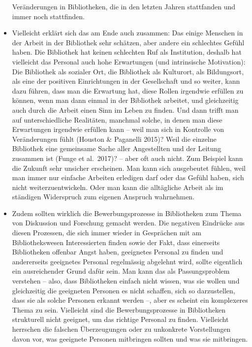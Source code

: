 \documentclass[a4paper,
fontsize=11pt,
oneside,
numbers=noperiodatend,
parskip=half-,
bibliography=totoc,
final
]{scrartcl}
\begin{document}
\begin{itemize}
  Veränderungen in Bibliotheken, die in den letzten Jahren stattfanden
  und immer noch stattfinden.
\item
  Vielleicht erklärt sich das am Ende auch zusammen: Das einige Menschen
  in der Arbeit in der Bibliothek sehr schätzen, aber andere ein
  schlechtes Gefühl haben. Die Bibliothek hat keinen schlechten Ruf als
  Institution, deshalb hat vielleicht das Personal auch hohe Erwartungen
  (und intrinsische Motivation): Die Bibliothek als sozialer Ort, die
  Bibliothek als Kulturort, als Bildungsort, als eine der positiven
  Einrichtungen in der Gesellschaft und so weiter, kann dazu führen,
  dass man die Erwartung hat, diese Rollen irgendwie erfüllen zu können,
  wenn man dann einmal in der Bibliothek arbeitet, und gleichzeitig auch
  durch die Arbeit einen Sinn im Leben zu finden. Und dann trifft man
  auf unterschiedliche Realitäten, manchmal solche, in denen man diese
  Erwartungen irgendwie erfüllen kann -- weil man sich in Kontrolle von
  Veränderungen fühlt (Houston \& Paganelli 2015)? Weil die einzelne
  Bibliothek eine gemeinsame Sache aller Angestellten und der Leitung
  zusammen ist (Funge et al.~2017)? -- aber oft auch nicht. Zum Beispiel
  kann die Zukunft sehr unsicher erscheinen. Man kann sich ausgebeutet
  fühlen, weil man immer nur einfache Arbeiten erledigen darf oder das
  Gefühl haben, sich nicht weiterzuentwickeln. Oder man kann die
  alltägliche Arbeit als im ständigen Widerspruch zum eigenen Anspruch
  wahrnehmen.
\item
  Zudem sollten wirklich die Bewerbungsprozesse in Bibliotheken zum
  Thema von Diskussion und Forschung gemacht werden. Die negativen
  Eindrücke aus diesen Prozessen, die sich immer wieder in Gesprächen
  mit am Bibliothekswesen Interessierten finden sowie der Fakt, dass
  einerseits Bibliotheken offenbar Angst haben, geeignetes Personal zu
  finden und andererseits geeignetes Personal regelmässig abgelehnt
  wird, sollte eigentlich ein ausreichender Grund dafür sein. Man kann
  das als Passungsproblem verstehen -- also, dass Bibliotheken einfach
  nicht wissen, was sie wollen und gleichzeitig die geeigneten Personen
  es nicht schaffen, sich so darzustellen, dass sie als solche Personen
  erkannt werden --, aber es scheint ein komplexeres Thema zu sein.
  Vielleicht sind die Bewerbungsprozesse in Bibliotheken strukturell
  nicht geeignet, um das richtige Personal zu finden. Vielleicht
  herrschen die falschen Überzeugungen oder zu unkonkrete Vorstellungen
  davon vor, was geeignete Personen mitbringen sollten und was sie
  mitbringen.
\end{itemize}
\end{document}
